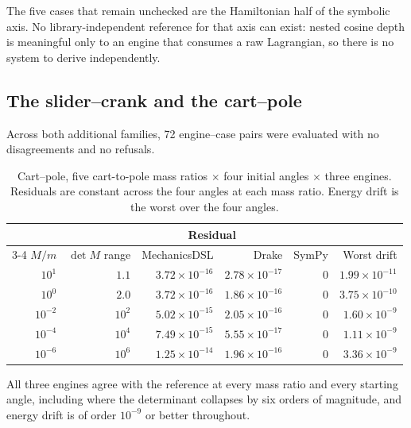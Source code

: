 \documentclass[review,12pt]{elsarticle}
\begin{document}
\noindent The five cases that remain unchecked are the Hamiltonian half of the
symbolic axis. No library-independent reference for that axis can exist: nested
cosine depth is meaningful only to an engine that consumes a raw Lagrangian, so
there is no system to derive independently.

\subsection{The slider--crank and the cart--pole}\label{sec:cartpole-results}
Across both additional families, 72 engine--case pairs were evaluated with no
disagreements and no refusals.

\begin{table}[!htbp]
\centering
\caption{Cart--pole, five cart-to-pole mass ratios $\times$ four initial angles
$\times$ three engines. Residuals are constant across the four angles at each
mass ratio. Energy drift is the worst over the four angles.}
\label{tab:cartpole}
\begin{tabular}{@{}rrrrrr@{}}
\toprule
& & \multicolumn{2}{c}{\textbf{Residual}} & \multicolumn{2}{c}{} \\
\cmidrule(lr){3-4}
$M/m$ & $\det M$ range & MechanicsDSL & Drake & SymPy & Worst drift \\
\midrule
$10^{1}$  & $1.1$      & $3.72\times10^{-16}$ & $2.78\times10^{-17}$ & $0$ & $1.99\times10^{-11}$ \\
$10^{0}$  & $2.0$      & $3.72\times10^{-16}$ & $1.86\times10^{-16}$ & $0$ & $3.75\times10^{-10}$ \\
$10^{-2}$ & $10^{2}$   & $5.02\times10^{-15}$ & $2.05\times10^{-16}$ & $0$ & $1.60\times10^{-9}$ \\
$10^{-4}$ & $10^{4}$   & $7.49\times10^{-15}$ & $5.55\times10^{-17}$ & $0$ & $1.11\times10^{-9}$ \\
$10^{-6}$ & $10^{6}$   & $1.25\times10^{-14}$ & $1.96\times10^{-16}$ & $0$ & $3.36\times10^{-9}$ \\
\bottomrule
\end{tabular}
\end{table}

All three engines agree with the reference at every mass ratio and every
starting angle, including where the determinant collapses by six orders of
magnitude, and energy drift is of order $10^{-9}$ or better throughout.
\end{document}
